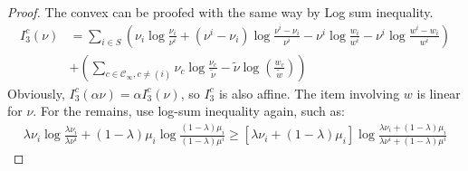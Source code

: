 \documentclass[11pt,en,cite=authoryear]{elegantpaper}
\begin{document}
\begin{proof}
    The convex can be proofed with the same way by Log sum inequality.
    \begin{align*}
        I^c_3(\nu)
        &= \sum_{i\in S} \left(\nu_{i}\log \frac{\nu_{i}}{\nu^i } + (\nu^i - \nu_i)\log \frac{\nu^i - \nu_i}{\nu^i}
        - \nu^i \log \frac{w_i}{w^i} - \nu^i \log \frac{w^i - w_i}{w^i} \right)\\
        &+ \left(\sum_{c \in \mathcal{C}_{\infty}, c\neq (i)} \nu_{c} \log \frac{\nu_{c}}{\tilde{\nu} }
        -\tilde{\nu}\log(\frac{ w_c}{\tilde{w} }) \right)
    \end{align*}
    Obviously, $I_3^c(\alpha \nu) = \alpha I_3^c( \nu)$, so $I_3^c$ is also affine.
    The item 
    involving $w$
    is linear for $\nu$. For the remains, use log-sum inequality again, such as:
    \begin{align*}
        \lambda \nu_{i}\log \frac{\lambda \nu_{i}}{\lambda \nu^i}
        + (1-\lambda) \mu_{i}\log \frac{(1-\lambda) \mu_{i}}{(1-\lambda) \mu^i}
        \ge [\lambda \nu_{i} + (1-\lambda) \mu_{i}] \log \frac{\lambda \nu_{i}+ (1-\lambda) \mu_{i}}{\lambda \nu^i +(1-\lambda) \mu^i}
    \end{align*}
\end{proof}
\end{document}
